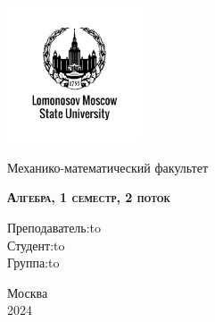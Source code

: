 \documentclass[a4paper, 12pt]{article}
\theoremstyle{definition}
\begin{document}
  \begin{titlepage}
    \newpage
    
    \begin{center}
    \includegraphics[width=4cm]{.image/image.png}
    \end{center}
    
    \vspace{4em}
    
    \begin{center}
    \Large Механико-математический факультет  
    \end{center}
    
    \vspace{2em}
    
    \begin{center}
    \large{\textsc{\textbf{Алгебра, 1 семестр, 2 поток}}}
    \end{center}
    
    \vspace{6em}
    

    
    \newbox{\lbox}
    \newlength{\maxl}
    \setlength{\maxl}{\wd\lbox}
    \hfill\parbox{11cm}
    {
    \hspace*{5cm}\hspace*{-5cm}Преподаватель:\hfill\hbox to \\

    \hspace*{5cm}\hspace*{-5cm}Студент:\hfill\hbox to\\

    \hspace*{5cm}\hspace*{-5cm}Группа:\hfill\hbox to
    }
    
    \vspace{\fill}
    
    \begin{center}
    Москва \\2024 
    \end{center}
  \end{titlepage}
  \tableofcontents
  \fontsize{14pt}{20pt}\selectfont
  \newpage
  \fontsize{14pt}{20pt}\selectfont
\end{document}
